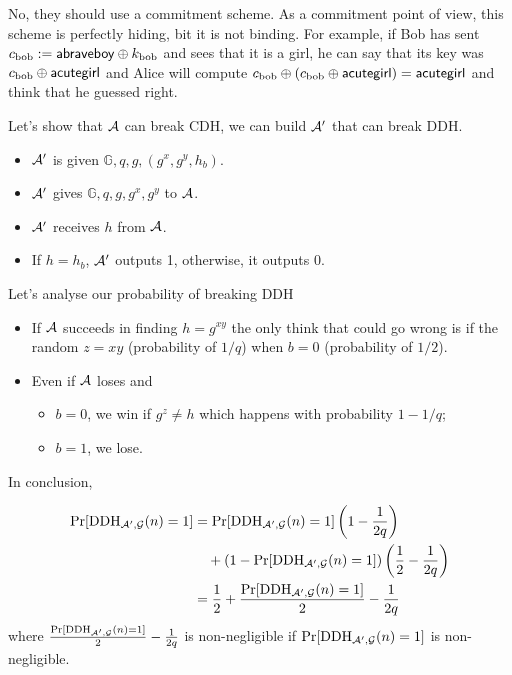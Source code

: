 \begin{solution}
  No, they should use a commitment scheme.
  As a commitment point of view, this scheme is perfectly hiding, bit it is not binding.
  For example, if Bob has sent $c_{\text{bob}} := \mathsf{abraveboy} \oplus k_{\text{bob}}$ and sees that it is a girl,
  he can say that its key was $c_{\text{bob}} \oplus \mathsf{acutegirl}$ and Alice will
  compute $c_{\text{bob}} \oplus (c_{\text{bob}} \oplus \mathsf{acutegirl}) = \mathsf{acutegirl}$ and think that he guessed right.
\end{solution}

\begin{solution}
  Let's show that $\mathcal{A}$ can break CDH, we can build $\mathcal{A}'$ that can break DDH.
  \begin{itemize}
    \item $\mathcal{A}'$ is given $\mathbb{G}, q, g, (g^x, g^y, h_b)$.
    \item $\mathcal{A}'$ gives $\mathbb{G}, q, g, g^x, g^y$ to $\mathcal{A}$.
    \item $\mathcal{A}'$ receives $h$ from $\mathcal{A}$.
    \item If $h = h_b$, $\mathcal{A}'$ outputs 1, otherwise, it outputs 0.
  \end{itemize}
  Let's analyse our probability of breaking DDH
  \begin{itemize}
    \item
      If $\mathcal{A}$ succeeds in finding $h = g^{xy}$ the only think that could go wrong
      is if the random $z = xy$ (probability of $1/q$) when $b = 0$ (probability of $1/2$).
    \item
      Even if $\mathcal{A}$ loses and
      \begin{itemize}
        \item $b = 0$, we win if $g^z \neq h$ which happens with probability $1-1/q$;
        \item $b = 1$, we lose.
      \end{itemize}
  \end{itemize}
  In conclusion,

  \begin{align*}
    \Pr[\operatorname{DDH}_{\mathcal{A}',\mathcal{G}}(n) = 1]
    & = \Pr[\operatorname{DDH}_{\mathcal{A}',\mathcal{G}}(n) = 1]\left(1 - \frac{1}{2q}\right)\\
    & \quad + (1 - \Pr[\operatorname{DDH}_{\mathcal{A}',\mathcal{G}}(n) = 1])\left(\frac{1}{2}-\frac{1}{2q}\right)\\
    & = \frac{1}{2} + \frac{\Pr[\operatorname{DDH}_{\mathcal{A}',\mathcal{G}}(n) = 1]}{2} - \frac{1}{2q}
  \end{align*}
  where $\frac{\Pr[\operatorname{DDH}_{\mathcal{A}',\mathcal{G}}(n) = 1]}{2} - \frac{1}{2q}$ is non-negligible if $\Pr[\operatorname{DDH}_{\mathcal{A}',\mathcal{G}}(n) = 1]$
  is non-negligible.
\end{solution}
